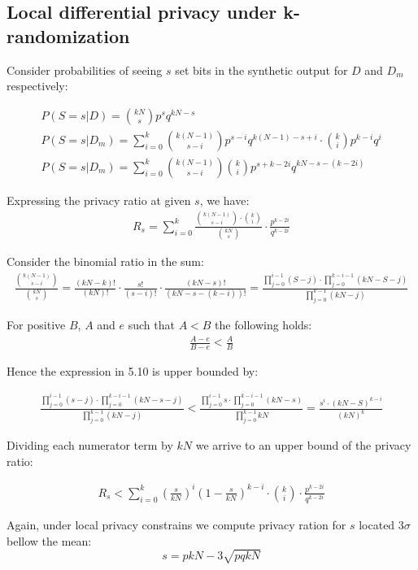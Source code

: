 \documentclass[11pt,draft]{article}
\begin{document}
\subsection{Local differential privacy under k-randomization}

Consider probabilities of seeing $s$ set bits in the synthetic output for $D$ and $D_m$ respectively:

\begin{align}
P(S=s | D ) = \binom{kN}{s}p^sq^{kN-s} \\
P(S=s | D_m ) = \sum_{i=0}^{k} \binom{k(N-1)}{s - i}p^{s-i}q^{k(N-1) - s + i} \cdot \binom{k}{i}p^{k-i}q^{i}  \\
P(S=s | D_m ) = \sum_{i=0}^{k}  \binom{k(N-1)}{s - i} \binom{k}{i} p^{s+k - 2i} q^{kN - s - (k-2i)}
\end{align}

Expressing the privacy ratio at given $s$, we have:
\begin{align}
R_s =  \sum_{i=0}^{k}  \frac{ \binom{k(N-1)}{s - i} \cdot \binom{k}{i} }{  \binom{kN}{s} }  \cdot \frac{p^{k-2i}} {q^{k-2i}}
\end{align}

Consider the binomial ratio in the sum:
\begin{align}
\frac{\binom{k(N-1)}{s - i} }{  \binom{kN}{s} } = \frac{(kN-k)!}{(kN)!}  \cdot \frac{s!}{(s-i)!}  \cdot \frac{(kN -s)!}{(kN - s - (k-i))!} = \frac{ \prod_{j=0}^{i-1} (S-j) \cdot \prod_{j=0}^{k-i-1} (kN - S-j) }{  \prod_{j=0}^{k-1} (kN -j) }
\end{align}

For positive $B$,  $A$ and $e$ such that $A < B$ the following holds:  
\begin{align}
\frac{A-e}{B-e} < \frac{A}{B}
\end{align}

Hence the expression in 5.10 is upper bounded by:

\begin{align}
\frac{ \prod_{j=0}^{i-1} (s-j) \cdot \prod_{j=0}^{k-i-1} (kN - s-j) }{  \prod_{j=0}^{k-1} (kN -j) }  < \frac{ \prod_{j=0}^{i-1} s \cdot \prod_{j=0}^{k-i-1} (kN - s)}{  \prod_{j=0}^{k-1} kN } = \frac{s^i \cdot (kN - S)^{k-i} } { (kN)^k }
\end{align}

Dividing each numerator term by $kN$ we arrive to an upper bound of the privacy ratio:

\begin{align}
R_s < \sum_{i=0}^{k}  \left ( \frac{s}{kN} \right )^i \left ( 1 - \frac{s}{kN} \right )^{k-i} \cdot \binom{k}{i}  \cdot \frac{p^{k-2i}} {q^{k-2i}}
\end{align}

Again, under local privacy constrains we compute privacy ration for $s$ located $3 \sigma$ bellow the mean:
\[ s = pkN - 3 \sqrt{pqkN} \]
\end{document}
